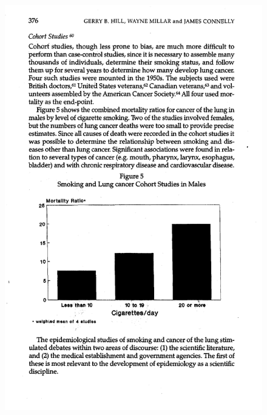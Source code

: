 \documentclass[notes=show]{beamer}
\begin{document}
\begin{frame}[plain]
	\begin{figure}
	\includegraphics[scale=0.5]{./lecture_includes/smoking_figure2.pdf}
	\end{figure}

\end{frame}	
	
\end{document}
